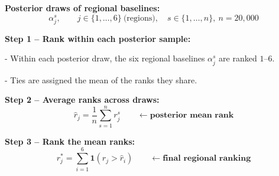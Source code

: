 \documentclass[varwidth=24cm,border=14pt]{standalone}
\begin{document}
\begin{minipage}{24cm}

\textbf{Posterior draws of regional baselines:}
\[
\alpha_j^s, \qquad j \in \{1,\dots,6\}\ \text{(regions)}, \quad s \in \{1,\dots,n\},\ n = 20{,}000
\]

\bigskip
\textbf{Step 1 -- Rank within each posterior sample:}

- Within each posterior draw, the six regional baselines $\alpha_j^s$ are ranked $1$--$6$.  

- Ties are assigned the mean of the ranks they share.

\bigskip
\textbf{Step 2 -- Average ranks across draws:}
\[
\hat{r}_j = \frac{1}{n} \sum_{s=1}^{n} r_j^s
\qquad \leftarrow \textbf{posterior mean rank}
\]

\bigskip
\textbf{Step 3 -- Rank the mean ranks:}
\[
r_j^{*} = \sum_{i=1}^{6} \mathbf{1}(\hat{r}_j > \hat{r}_i)
\qquad \leftarrow \textbf{final regional ranking}
\]

\end{minipage}
\end{document}
